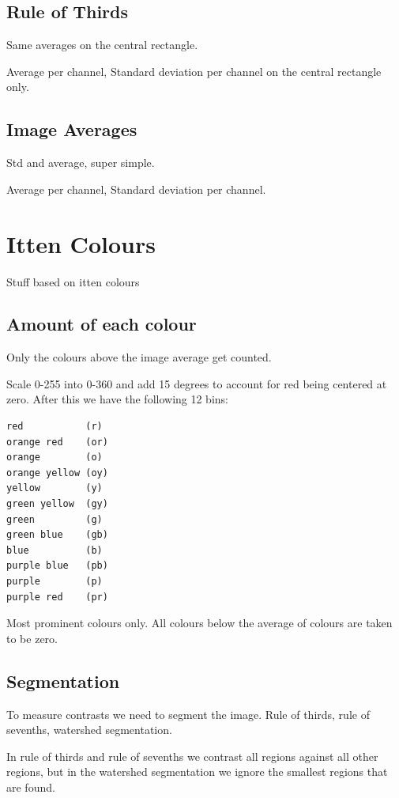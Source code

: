 \documentclass[11pt,a4paper,draft]{report}
\begin{document}
\begin{multicols}{2}
\subsection{Rule of Thirds}

Same averages on the central rectangle.

Average per channel, Standard deviation per channel on the central rectangle
only.

\subsection{Image Averages}

Std and average, super simple.

Average per channel, Standard deviation per channel.

\section{Itten Colours}

Stuff based on itten colours

\subsection{Amount of each colour}

Only the colours above the image average get counted.

Scale 0-255 into 0-360 and add 15 degrees to account for red being centered
at zero.  After this we have the following 12 bins:

\begin{verbatim}
red           (r)
orange red    (or)
orange        (o)
orange yellow (oy)
yellow        (y)
green yellow  (gy)
green         (g)
green blue    (gb)
blue          (b)
purple blue   (pb)
purple        (p)
purple red    (pr)
\end{verbatim}

Most prominent colours only.  All colours below the average of colours are
taken to be zero.

\subsection{Segmentation}

To measure contrasts we need to segment the image.  Rule of thirds, rule of
sevenths, watershed segmentation.

In rule of thirds and rule of sevenths we contrast all regions against all
other regions, but in the watershed segmentation we ignore the smallest
regions that are found.


\end{multicols}
\end{document}
